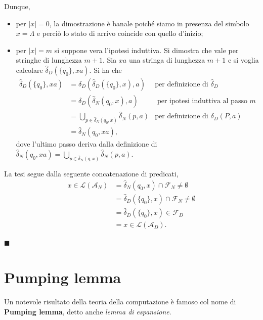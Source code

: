 \documentclass[10pt]{\classname}
\theoremstyle{definition}
\theoremstyle{definition}
\theoremstyle{definition}
\theoremstyle{definition}
\begin{document}
Dunque,
\begin{itemize}
    \item per $|x|=0$, la dimostrazione è banale poiché siamo in presenza del simbolo $x=\Lambda$ e perciò lo stato di arrivo coincide con quello d'inizio;
    \item per $|x| = m$ si suppone vera l'ipotesi induttiva. Si dimostra che vale per stringhe di lunghezza $m+1$. Sia $xa$ una stringa di lunghezza $m + 1$ e si voglia calcolare $\hat \delta_D(\{q_0\}, xa).$ Si ha che
        \begin{align*}
            \hat\delta_D(\{q_0\}, xa) &= \delta_D(\hat\delta_D(\{q_0\}, x), a) & \mbox{per definizione di }\hat\delta_D \\
                                      &= \delta_D(\hat\delta_N(q_0, x), a) & \mbox{ per ipotesi induttiva al passo } m\\
                                      &= \bigcup_{p\in\hat\delta_N(q_0, x)} \hat\delta_N(p, a) & \mbox{per definizione di } \delta_D(P,a)\\
                                      &= \hat\delta_N(q_0, xa), &
        \end{align*}
        dove l'ultimo passo deriva dalla definizione di $\hat\delta_N(q_0, xa) = \bigcup_{p \in \hat\delta_N(q, x)} \hat\delta_N (p, a)$.
\end{itemize}

La tesi segue dalla seguente concatenazione di predicati,
\begin{align*}
    x \in \mathcal L (\mathcal A_N) &= \hat\delta_N(q_0, x) \cap \mathcal F_N \neq \emptyset \\
                                    &= \hat\delta_D(\{q_0\}, x) \cap \mathcal F_N \neq \emptyset \\
                                    &= \hat\delta_D(\{q_0\}, x) \in \mathcal F_D \\
                                    &= x \in \mathcal L (\mathcal A_D).
\end{align*}

\begin{flushright}
$\blacksquare$
\end{flushright}


\section{Pumping lemma}

Un notevole risultato della teoria della computazione è famoso col nome di
\textbf{Pumping lemma}, detto anche \emph{lemma di espansione}.
\end{document}
